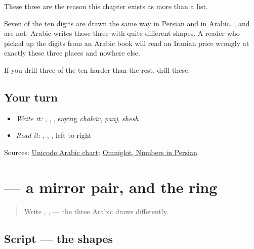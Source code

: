 These three are the reason this chapter exists as more than a list.

Seven of the ten digits are drawn the same way in Persian and in Arabic. \textbf{}, \textbf{} and \textbf{} are not: Arabic writes those three with quite different shapes. A reader who picked up the digits from an Arabic book will read an Iranian price wrongly at exactly these three places and nowhere else.

If you drill three of the ten harder than the rest, drill these.

\subsection*{Your turn}
\begin{itemize}
\raggedright
  \item \emph{Write it:} \textbf{}, \textbf{}, \textbf{}, saying \emph{chahâr}, \emph{panj}, \emph{shesh}
  \item \emph{Read it:} \textbf{}, \textbf{}, \textbf{}, left to right
\end{itemize}

\begin{tcolorbox}[breakable,colback=teal!4,colframe=teal!35!black,title={Before you move on}]
Sources: \href{https://www.unicode.org/charts/PDF/U0600.pdf}{Unicode Arabic chart}; \href{https://www.omniglot.com/language/numbers/persian.htm}{Omniglot, Numbers in Persian}.
\end{tcolorbox}
\section[\texorpdfstring{\fa{۷} \fa{۸} \fa{۹} (haft hasht noh)}{۷ ۸ ۹ (haft hasht noh)}]{   — a mirror pair, and the ring}

\label{lesson:FA-W19-digits-seven-eight-nine}



\begin{quote}
Write \textbf{}, \textbf{}, \textbf{} — the three Arabic draws differently.
\end{quote}

\subsection*{Script — the shapes}

